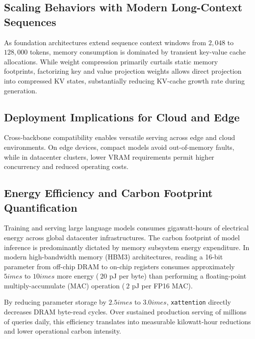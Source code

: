 \subsection{Scaling Behaviors with Modern Long-Context Sequences}
As foundation architectures extend sequence context windows from $2{,}048$ to $128{,}000$ tokens, memory consumption is dominated by transient key-value cache allocations. While weight compression primarily curtails static memory footprints, factorizing key and value projection weights allows direct projection into compressed KV states, substantially reducing KV-cache growth rate during generation.

\subsection{Deployment Implications for Cloud and Edge}
Cross-backbone compatibility enables versatile serving across edge and cloud environments. On edge devices, compact models avoid out-of-memory faults, while in datacenter clusters, lower VRAM requirements permit higher concurrency and reduced operating costs.

\subsection{Energy Efficiency and Carbon Footprint Quantification}
Training and serving large language models consumes gigawatt-hours of electrical energy across global datacenter infrastructures. The carbon footprint of model inference is predominantly dictated by memory subsystem energy expenditure. In modern high-bandwidth memory (HBM3) architectures, reading a 16-bit parameter from off-chip DRAM to on-chip registers consumes approximately $5	imes$ to $10	imes$ more energy ($~20$ pJ per byte) than performing a floating-point multiply-accumulate (MAC) operation ($~2$ pJ per FP16 MAC).

By reducing parameter storage by $2.5	imes$ to $3.0	imes$, \texttt{xattention} directly decreases DRAM byte-read cycles. Over sustained production serving of millions of queries daily, this efficiency translates into measurable kilowatt-hour reductions and lower operational carbon intensity.
